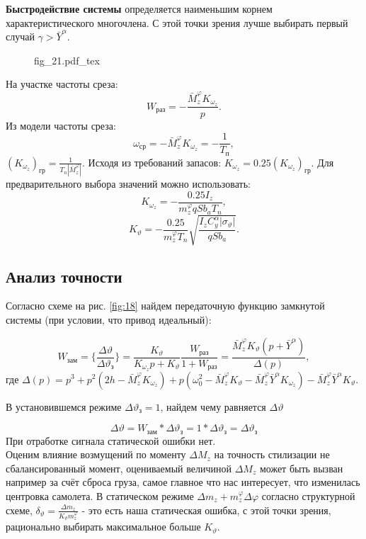 \documentclass{article}
\begin{document}
\textbf{Быстродействие системы} определяется наименьшим корнем
характеристического многочлена.
С этой точки зрения лучше выбирать первый случай $\gamma > \bar{Y}^\alpha$.

\begin{figure}[H]
	\centering
	{fig_21.pdf_tex}
\end{figure}

На участке частоты среза:
\[
	W_\text{раз} = -\frac{\bar{M}_z^\varphi K_{\omega_z}}{p}.
\]
Из модели частоты среза:
\[
	\omega_\text{ср} = -\bar{M}_z^\varphi K_{\omega_z} = -\frac{1}{T_\text{п}},
\]
$(K_{\omega_z})_\text{гр} = \frac{1}{T_n |\bar{M}_z^\varphi|}.$
Исходя из требований запасов:
$K_{\omega_z} = 0.25 (K_{\omega_z})_\text{гр}.$
Для предварительного выбора значений можно использовать:
\[
	K_{\omega_z} = - \frac{0.25 I_z}{{m}_z^\varphi q S b_a T_n},
\]
\[
	K_{\vartheta} = - \frac{0.25}{{m}_z^\varphi T_n} \sqrt{\frac{I_z C_y^\alpha
			|\sigma_\vartheta|}{q S b_a}}.
\]

\subsection{Анализ точности}
Согласно схеме на рис. \ref{fig:18} найдем передаточную функцию замкнутой
системы (при условии, что привод идеальный):

\begin{equation}
	W_\text{зам}= \{\frac{\Delta \vartheta}{\Delta \vartheta_\text{з}}\}
	=\frac{K_{\vartheta}}{K_{\omega_z}p +K_{\vartheta}}\frac{W_\text{раз}}{1 +
		W_\text{раз}} =\frac{\bar{M}_z^\varphi K_{\vartheta}(p +
		\bar{Y}^\alpha)}{\Delta(p)},
	\label{eq:w_zam_1}
\end{equation}
где $\Delta(p) = p^3 + p^2(2h - \bar{M}_z^\varphi K_{\omega_z}) + p(\omega_0^2
	-\bar{M}_z^\varphi K_\vartheta - \bar{M}_z^\varphi \bar{Y}^\alpha K_{\omega_z})
	-\bar{M}_z^\varphi \bar{Y}^\alpha K_{\vartheta} $.

В установившемся режиме $\Delta \vartheta_\text{з} = 1$, найдем чему равняется
$\Delta \vartheta$

\[
	\Delta \vartheta = W_\text{зам} * \Delta \vartheta_\text{з} = 1* \Delta
	\vartheta_\text{з} = \Delta \vartheta_\text{з}
\]
При отработке сигнала статической ошибки нет. \\
Оценим влияние возмущений по моменту $\Delta M_z$ на точность стилизации не
сбалансированный момент, оцениваемый величиной $\Delta M_z$ может быть вызван
например за счёт сброса груза, самое главное что нас интересует, что изменилась
центровка самолета. В статическом режиме $\Delta m_z + m_z^\varphi \Delta
	\varphi$ согласно структурной схеме, $\delta_\vartheta =\frac{\Delta
		m_z}{K_\vartheta m_z^\varphi}$ - это есть наша статическая ошибка, с этой точки
зрения, рационально выбирать максимальное больше $K_\vartheta$.
\end{document}
